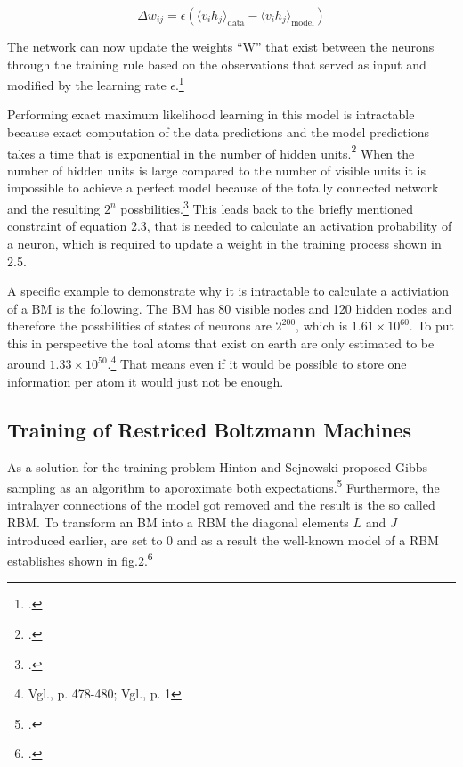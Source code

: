 \begin{equation}
    \Delta w_{ij} = \epsilon ( \langle v_i h_j \rangle_{\text{data}} - \langle v_i h_j \rangle_{\text{model}} )
\end{equation}

The network can now update the weights ``W'' that exist between the neurons through the training rule based on the observations that served as input and modified by the learning rate \(\epsilon\).\footcite[Vgl.][1-2]{barraEquivalenceHopfieldNetworks2012}

Performing exact maximum likelihood learning in this model is intractable because exact computation of the data predictions and the model predictions takes a time that is exponential in the number of hidden units.\footcite[Vgl.][449]{salakhutdinovDeepBoltzmannMachines2009}
When the number of hidden units is large compared to the number of visible units it is impossible to achieve a perfect model because of the totally connected network and the resulting \( 2^n \) possbilities.\footcite[Vgl.][154]{ackleyLearningAlgorithmBoltzmann1985}
This leads back to the briefly mentioned constraint of equation 2.3, that is needed to calculate an activation probability of a neuron, which is required to update a weight in the training process shown in 2.5.

A specific example to demonstrate why it is intractable to calculate a activiation of a \ac{BM} is the following. The \ac{BM} has 80 visible nodes and 120 hidden nodes and therefore the possbilities of states of neurons are \( 2^{200} \), which is \( 1.61 \times 10^{60}\). 
To put this in perspective the toal atoms that exist on earth are only estimated to be around \( 1.33 \times 10^{50}\).\footnote{Vgl.\cite{helmenstineHowManyAtoms2022}, p. 478-480; Vgl.\cite{schlammingerCoolWayMeasure2014}, p. 1}
That means even if it would be possible to store one information per atom it would just not be enough. 

\subsection{Training of Restriced Boltzmann Machines}

As a solution for the training problem Hinton and Sejnowski proposed Gibbs sampling as an algorithm to aporoximate both expectations.\footcite[Vgl.][158-165]{ackleyLearningAlgorithmBoltzmann1985}
Furthermore, the intralayer connections of the model got removed and the result is the so called \ac{RBM}.
To transform an \ac{BM} into a \ac{RBM} the diagonal elements \( L \) and \( J \)  introduced earlier, are set to 0 and as a result the well-known model of a \ac{RBM} establishes shown in fig.2.\footcite[Vgl.][449]{salakhutdinovDeepBoltzmannMachines2009}

